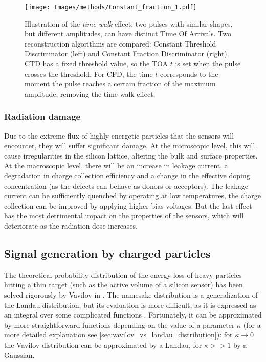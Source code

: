 \begin{figure}[h!btp]
    \centering
    \texttt{[image: Images/methods/Constant\_fraction\_1.pdf]}
    \captionsetup{width=\captionwidth}
    \caption{Illustration of the \textit{time walk} effect: two pulses with similar shapes, but different amplitudes, can have distinct Time Of Arrivals. Two reconstruction algorithms are compared: Constant Threshold Discriminator (left) and Constant Fraction Discriminator (right). CTD has a fixed threshold value, so the TOA \(t\) is set when the pulse crosses the threshold. For CFD, the time \(t\) corresponds to the moment the pulse reaches a certain fraction of the maximum amplitude, removing the time walk effect.}
    \label{fig:constant fraction}
\end{figure} 


\subsubsection{Radiation damage}

Due to the extreme flux of highly energetic particles that the sensors will encounter, they will suffer significant damage. At the microscopic level, this will cause irregularities in the silicon lattice, altering the bulk and surface properties. At the macroscopic level, there will be an increase in leakage current, a degradation in charge collection efficiency and a change in the effective doping concentration \cite{Moll:1999kv} (as the defects can behave as donors or acceptors). The leakage current can be sufficiently quenched by operating at low temperatures, the charge collection can be improved by applying higher bias voltages. But the last effect has the most detrimental impact on the properties of the sensors, which will deteriorate as the radiation dose increases.


\subsection{Signal generation by charged particles}\label{subsec:charged_particles_distribution}
The theoretical probability distribution of the energy loss of heavy particles hitting a thin target (such as the active volume of a silicon sensor) has been solved rigorously by Vavilov in \cite{vavilov_1957}. The namesake distribution is a generalization of the Landau distribution, but its evaluation is more difficult, as it is expressed as an integral over some complicated functions \cite[Eq.(4)]{vavilov_1957}. Fortunately, it can be approximated by more straightforward functions depending on the value of a parameter \(\kappa\) (for a more detailed explanation see \ref{sec:vavilov_vs_landau_distribution}): for \(\kappa\rightarrow0\) the Vavilov distribution can be approximated by a Landau, for \(\kappa>>1\) by a Gaussian.

